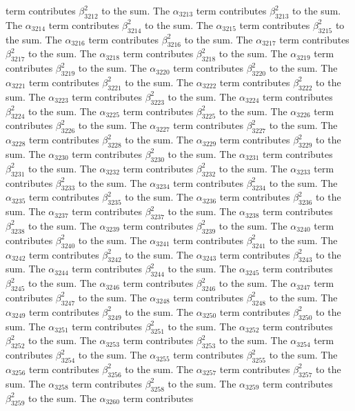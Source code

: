 \begin{lemma}
term contributes $\beta_{3212}^{2}$ to the sum. The $\alpha_{3213}$ term contributes $\beta_{3213}^{2}$ to the sum. The $\alpha_{3214}$ term contributes $\beta_{3214}^{2}$ to the sum. The $\alpha_{3215}$ term contributes $\beta_{3215}^{2}$ to the sum. The $\alpha_{3216}$ term contributes $\beta_{3216}^{2}$ to the sum. The $\alpha_{3217}$ term contributes $\beta_{3217}^{2}$ to the sum. The $\alpha_{3218}$ term contributes $\beta_{3218}^{2}$ to the sum. The $\alpha_{3219}$ term contributes $\beta_{3219}^{2}$ to the sum. The $\alpha_{3220}$ term contributes $\beta_{3220}^{2}$ to the sum. The $\alpha_{3221}$ term contributes $\beta_{3221}^{2}$ to the sum. The $\alpha_{3222}$ term contributes $\beta_{3222}^{2}$ to the sum. The $\alpha_{3223}$ term contributes $\beta_{3223}^{2}$ to the sum. The $\alpha_{3224}$ term contributes $\beta_{3224}^{2}$ to the sum. The $\alpha_{3225}$ term contributes $\beta_{3225}^{2}$ to the sum. The $\alpha_{3226}$ term contributes $\beta_{3226}^{2}$ to the sum. The $\alpha_{3227}$ term contributes $\beta_{3227}^{2}$ to the sum. The $\alpha_{3228}$ term contributes $\beta_{3228}^{2}$ to the sum. The $\alpha_{3229}$ term contributes $\beta_{3229}^{2}$ to the sum. The $\alpha_{3230}$ term contributes $\beta_{3230}^{2}$ to the sum. The $\alpha_{3231}$ term contributes $\beta_{3231}^{2}$ to the sum. The $\alpha_{3232}$ term contributes $\beta_{3232}^{2}$ to the sum. The $\alpha_{3233}$ term contributes $\beta_{3233}^{2}$ to the sum. The $\alpha_{3234}$ term contributes $\beta_{3234}^{2}$ to the sum. The $\alpha_{3235}$ term contributes $\beta_{3235}^{2}$ to the sum. The $\alpha_{3236}$ term contributes $\beta_{3236}^{2}$ to the sum. The $\alpha_{3237}$ term contributes $\beta_{3237}^{2}$ to the sum. The $\alpha_{3238}$ term contributes $\beta_{3238}^{2}$ to the sum. The $\alpha_{3239}$ term contributes $\beta_{3239}^{2}$ to the sum. The $\alpha_{3240}$ term contributes $\beta_{3240}^{2}$ to the sum. The $\alpha_{3241}$ term contributes $\beta_{3241}^{2}$ to the sum. The $\alpha_{3242}$ term contributes $\beta_{3242}^{2}$ to the sum. The $\alpha_{3243}$ term contributes $\beta_{3243}^{2}$ to the sum. The $\alpha_{3244}$ term contributes $\beta_{3244}^{2}$ to the sum. The $\alpha_{3245}$ term contributes $\beta_{3245}^{2}$ to the sum. The $\alpha_{3246}$ term contributes $\beta_{3246}^{2}$ to the sum. The $\alpha_{3247}$ term contributes $\beta_{3247}^{2}$ to the sum. The $\alpha_{3248}$ term contributes $\beta_{3248}^{2}$ to the sum. The $\alpha_{3249}$ term contributes $\beta_{3249}^{2}$ to the sum. The $\alpha_{3250}$ term contributes $\beta_{3250}^{2}$ to the sum. The $\alpha_{3251}$ term contributes $\beta_{3251}^{2}$ to the sum. The $\alpha_{3252}$ term contributes $\beta_{3252}^{2}$ to the sum. The $\alpha_{3253}$ term contributes $\beta_{3253}^{2}$ to the sum. The $\alpha_{3254}$ term contributes $\beta_{3254}^{2}$ to the sum. The $\alpha_{3255}$ term contributes $\beta_{3255}^{2}$ to the sum. The $\alpha_{3256}$ term contributes $\beta_{3256}^{2}$ to the sum. The $\alpha_{3257}$ term contributes $\beta_{3257}^{2}$ to the sum. The $\alpha_{3258}$ term contributes $\beta_{3258}^{2}$ to the sum. The $\alpha_{3259}$ term contributes $\beta_{3259}^{2}$ to the sum. The $\alpha_{3260}$ term contributes 
\end{lemma}
